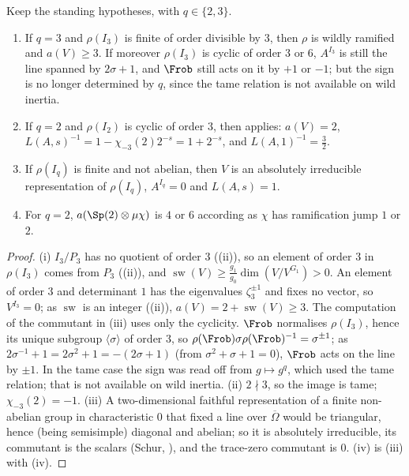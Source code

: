 \begin{proposition}\label{prop:local:wild-shapes}
Keep the standing hypotheses, with $q\in\{2,3\}$.
\begin{enumerate}[label=(\roman*)]
\item If $q=3$ and $\rho(I_3)$ is finite of order divisible by $3$, then $\rho$ is wildly ramified and $a(V)\ge3$. If moreover $\rho(I_3)$ is cyclic of order $3$ or
$6$, $A^{I_3}$ is still the line spanned by $2\sigma+1$, and $\Frob$ still acts on it by $+1$ or $-1$; but the sign is no longer determined by $q$,
since the tame relation is not available on wild inertia.
\item If $q=2$ and $\rho(I_2)$ is cyclic of order $3$, then  applies: $a(V)=2$, $L(A,s)^{-1}=1-\chi_{-3}(2)2^{-s}=1+2^{-s}$, and
$L(A,1)^{-1}=\frac32$.
\item If $\rho(I_q)$ is finite and not abelian, then $V$ is an absolutely irreducible representation of $\rho(I_q)$, $A^{I_q}=0$ and $L(A,s)=1$.
\item For $q=2$, $a(\Sp(2)\otimes\mu\chi)$ is $4$ or $6$ according as $\chi$ has ramification jump $1$ or $2$.
\end{enumerate}
\end{proposition}

\begin{proof}
(i) $I_3/P_3$ has no quotient of order $3$ ((ii)), so an element of order $3$ in $\rho(I_3)$ comes from $P_3$ ((ii)),
and $\operatorname{sw}(V)\ge\frac{g_1}{g_0}\dim(V/V^{G_1})>0$. An element of order $3$ and determinant $1$ has the eigenvalues $\zeta_3^{\pm1}$ and fixes no vector, so
$V^{I_3}=0$; as $\operatorname{sw}$ is an integer ((ii)), $a(V)=2+\operatorname{sw}(V)\ge3$. The computation of the commutant in (iii) uses only the cyclicity. $\Frob$ normalises $\rho(I_3)$, hence its unique subgroup $\langle\sigma\rangle$ of
order $3$, so $\rho(\Frob)\sigma\rho(\Frob)^{-1}=\sigma^{\pm1}$; as $2\sigma^{-1}+1=2\sigma^2+1=-(2\sigma+1)$ (from $\sigma^2+\sigma+1=0$), $\Frob$ acts on the line by
$\pm1$. In the tame case the sign was read off from $g\mapsto g^q$, which used the tame relation; that is not available on wild inertia. (ii) $2\nmid3$, so the image is tame; $\chi_{-3}(2)=-1$. (iii) A two-dimensional
faithful representation of a finite non-abelian group in characteristic $0$ that fixed a line over $\overline\Omega$ would be triangular, hence (being semisimple)
diagonal and abelian; so it is absolutely irreducible, its commutant is the scalars (Schur, ), and the trace-zero commutant is $0$. (iv) is
(iii) with (iv).
\end{proof}

